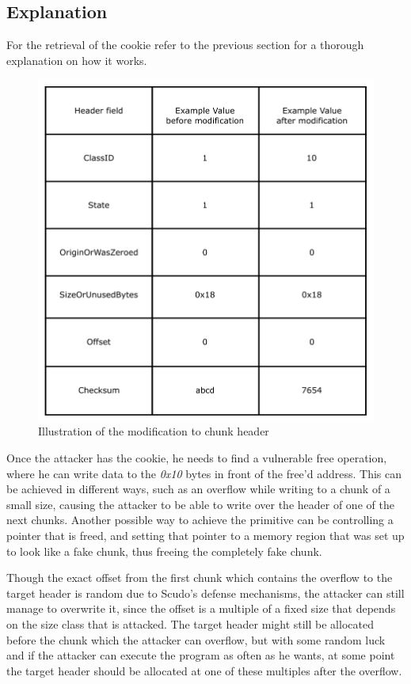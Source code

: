 \documentclass[a4paper,11pt,oneside]{report}
\begin{document}
\subsection{Explanation}

For the retrieval of the cookie refer to the previous section for a thorough explanation
on how it works.

\begin{figure}[h!]
  \centering
  \includegraphics[width=\linewidth]{figures/ChangeClassID.png}
  \caption{Illustration of the modification to chunk header}\label{fig:ChangeClassID}
\end{figure}

Once the attacker has the cookie, he needs to find a vulnerable free operation, where he
can write data to the \emph{0x10} bytes in front of the free'd address. 
This can be achieved in different ways, such as an overflow while writing to a chunk of a
small size, causing the attacker to be able to write over the header of one of the next
chunks. Another possible way to achieve the primitive can be controlling a pointer that is
freed, and setting that pointer to a memory region that was set up to look like a fake
chunk, thus freeing the completely fake chunk.

Though the exact offset from the first chunk which contains the overflow
to the target header is random due to Scudo's defense mechanisms, the attacker can still
manage to overwrite it, since the offset is a multiple of a fixed size that depends on the
size class that is attacked. The target header might still be allocated before the chunk
which the attacker can overflow, but with some random luck and if the attacker can execute
the program as often as he wants, at some point the target header should be allocated at
one of these multiples after the overflow.
\end{document}
